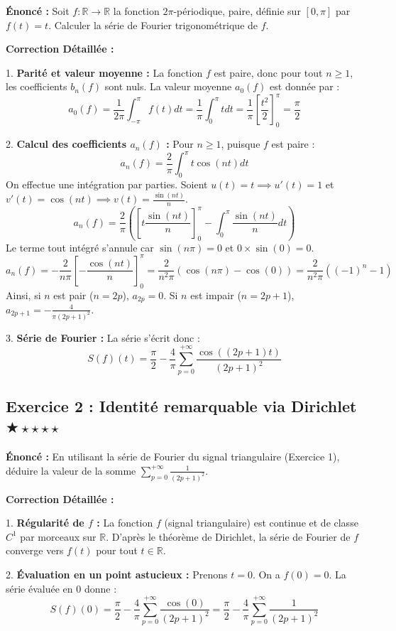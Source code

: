 \documentclass[11pt,a4paper]{article}
\begin{document}
\textbf{Énoncé :}
Soit $f : \mathbb{R} \to \mathbb{R}$ la fonction $2\pi$-périodique, paire, définie sur $[0, \pi]$ par $f(t) = t$. Calculer la série de Fourier trigonométrique de $f$.

\textbf{Correction Détaillée :}

1. \textbf{Parité et valeur moyenne :}
   La fonction $f$ est paire, donc pour tout $n \ge 1$, les coefficients $b_n(f)$ sont nuls.
   La valeur moyenne $a_0(f)$ est donnée par :
   $$ a_0(f) = \frac{1}{2\pi} \int_{-\pi}^{\pi} f(t) dt = \frac{1}{\pi} \int_0^{\pi} t dt = \frac{1}{\pi} \left[ \frac{t^2}{2} \right]_0^\pi = \frac{\pi}{2} $$

2. \textbf{Calcul des coefficients $a_n(f)$ :}
   Pour $n \ge 1$, puisque $f$ est paire :
   $$ a_n(f) = \frac{2}{\pi} \int_0^{\pi} t \cos(nt) dt $$
   On effectue une intégration par parties. Soient $u(t) = t \implies u'(t) = 1$ et $v'(t) = \cos(nt) \implies v(t) = \frac{\sin(nt)}{n}$.
   $$ a_n(f) = \frac{2}{\pi} \left( \left[ t \frac{\sin(nt)}{n} \right]_0^\pi - \int_0^\pi \frac{\sin(nt)}{n} dt \right) $$
   Le terme tout intégré s'annule car $\sin(n\pi) = 0$ et $0 \times \sin(0) = 0$.
   $$ a_n(f) = -\frac{2}{n\pi} \left[ -\frac{\cos(nt)}{n} \right]_0^\pi = \frac{2}{n^2\pi} (\cos(n\pi) - \cos(0)) = \frac{2}{n^2\pi} ((-1)^n - 1) $$
   Ainsi, si $n$ est pair ($n=2p$), $a_{2p} = 0$. Si $n$ est impair ($n=2p+1$), $a_{2p+1} = -\frac{4}{\pi(2p+1)^2}$.

3. \textbf{Série de Fourier :}
   La série s'écrit donc :
   $$ S(f)(t) = \frac{\pi}{2} - \frac{4}{\pi} \sum_{p=0}^{+\infty} \frac{\cos((2p+1)t)}{(2p+1)^2} $$


\subsection*{Exercice 2 : Identité remarquable via Dirichlet \quad $\bigstar\star\star\star\star$}

\textbf{Énoncé :}
En utilisant la série de Fourier du signal triangulaire (Exercice 1), déduire la valeur de la somme $\sum_{p=0}^{+\infty} \frac{1}{(2p+1)^2}$.

\textbf{Correction Détaillée :}

1. \textbf{Régularité de $f$ :}
   La fonction $f$ (signal triangulaire) est continue et de classe $C^1$ par morceaux sur $\mathbb{R}$.
   D'après le théorème de Dirichlet, la série de Fourier de $f$ converge vers $f(t)$ pour tout $t \in \mathbb{R}$.

2. \textbf{Évaluation en un point astucieux :}
   Prenons $t = 0$. On a $f(0) = 0$.
   La série évaluée en $0$ donne :
   $$ S(f)(0) = \frac{\pi}{2} - \frac{4}{\pi} \sum_{p=0}^{+\infty} \frac{\cos(0)}{(2p+1)^2} = \frac{\pi}{2} - \frac{4}{\pi} \sum_{p=0}^{+\infty} \frac{1}{(2p+1)^2} $$
\end{document}

